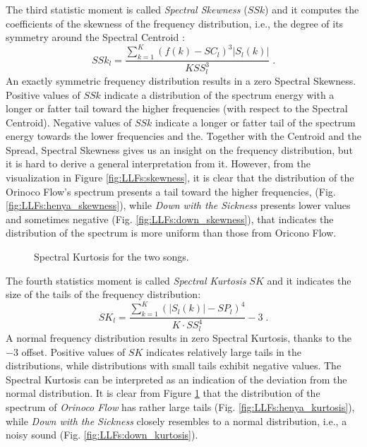 The third statistic moment is called \textit{Spectral Skewness} ($SSk$) and it computes the coefficients of the skewness of the frequency distribution, i.e., the degree of its symmetry around the Spectral Centroid \cite{Tanghe2005}:
\begin{equation}\label{eq:FSSK}
SSk_l = \frac{\sum\limits_{k=1}^{K}(f(k)-SC_l)^3 |S_l(k)|}{K SS_l^3} \; .
\end{equation}
An exactly symmetric frequency distribution results in a zero Spectral Skewness. Positive values of $SSk$ indicate a distribution of the spectrum energy with a longer or fatter tail toward the higher frequencies (with respect to the Spectral Centroid). Negative values of $SSk$ indicate a longer or fatter tail of the spectrum energy towards the lower frequencies and the. Together with the Centroid and the Spread, Spectral Skewness gives us an insight on the frequency distribution, but it is hard to derive a general interpretation from it. However, from the visualization in Figure \ref{fig:LLFs:skewness}, it is clear that the distribution of the Orinoco Flow's spectrum presents a tail toward the higher frequencies, (Fig. \ref{fig:LLFs:henya_skewness}), while \textit{Down with the Sickness} presents lower values and sometimes negative (Fig. \ref{fig:LLFs:down_skewness}), that indicates the distribution of the spectrum is more uniform than those from Oricono Flow.

\begin{figure}[tb]
        \centering
         \hfil
      \caption{Spectral Kurtosis for the two songs.}
      \label{fig:LLFs:kurtosis}          
\end{figure}

The fourth statistics moment is called \textit{Spectral Kurtosis} $SK$ and it indicates the size of the tails of the frequency distribution:
\begin{equation}\label{eq:FSK}
SK_l = \frac{\sum\limits_{k=1}^{K} (|S_l(k)|-SP_l)^4 }{K \cdot SS_l^4} -3 \; .
\end{equation}
A normal frequency distribution results in zero Spectral Kurtosis, thanks to the $-3$ offset. Positive values of $SK$ indicates relatively large tails in the distributions, while distributions with small tails exhibit negative values. The Spectral Kurtosis can be interpreted as an indication of the deviation from the normal distribution. It is clear from Figure \ref{fig:LLFs:kurtosis} that the distribution of the spectrum of \textit{Orinoco Flow} has rather large tails (Fig. \ref{fig:LLFs:henya_kurtosis}), while \textit{Down with the Sickness} closely resembles to a normal distribution, i.e., a noisy sound (Fig. \ref{fig:LLFs:down_kurtosis}).


